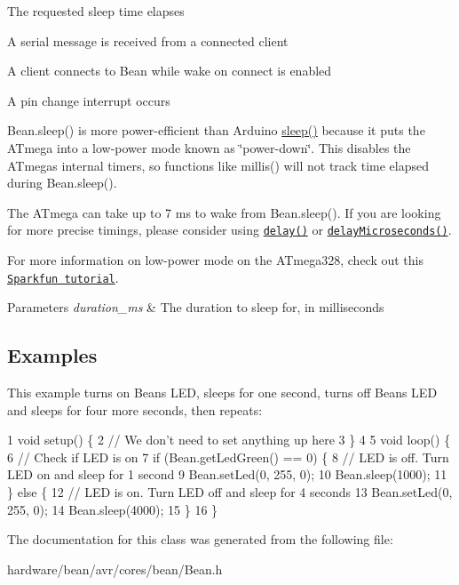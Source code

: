 \begin{DoxyItemize}
\item The requested sleep time elapses
\item A serial message is received from a connected client
\item A client connects to Bean while wake on connect is enabled
\item A pin change interrupt occurs
\end{DoxyItemize}

{\ttfamily Bean.\+sleep()} is more power-\/efficient than Arduino {\ttfamily \hyperlink{class_bean_class_a15d6716d0bdc66a0345acc29d0c14a14}{sleep()}} because it puts the A\+Tmega into a low-\/power mode known as \char`\"{}power-\/down\char`\"{}. This disables the A\+Tmega\textquotesingle{}s internal timers, so functions like {\ttfamily millis()} will not track time elapsed during {\ttfamily Bean.\+sleep()}.

The A\+Tmega can take up to 7 ms to wake from {\ttfamily Bean.\+sleep()}. If you are looking for more precise timings, please consider using \href{https://www.arduino.cc/en/Reference/Delay}{\tt delay()} or \href{https://www.arduino.cc/en/Reference/DelayMicroseconds}{\tt delay\+Microseconds()}.

For more information on low-\/power mode on the A\+Tmega328, check out this \href{https://www.sparkfun.com/tutorials/309}{\tt Sparkfun tutorial}.


\begin{DoxyParams}{Parameters}
{\em duration\+\_\+ms} & The duration to sleep for, in milliseconds\\
\hline
\end{DoxyParams}
\subsection*{Examples}

This example turns on Bean\textquotesingle{}s L\+ED, sleeps for one second, turns off Bean\textquotesingle{}s L\+ED and sleeps for four more seconds, then repeats\+:


\begin{DoxyCodeInclude}
1 void setup() \{
2   // We don't need to set anything up here
3 \}
4 
5 void loop() \{
6   // Check if LED is on
7   if (Bean.getLedGreen() == 0) \{
8     // LED is off. Turn LED on and sleep for 1 second
9     Bean.setLed(0, 255, 0);
10     Bean.sleep(1000);
11   \} else \{
12     // LED is on. Turn LED off and sleep for 4 seconds
13     Bean.setLed(0, 255, 0);
14     Bean.sleep(4000);
15   \}
16 \}
\end{DoxyCodeInclude}
 

The documentation for this class was generated from the following file\+:\begin{DoxyCompactItemize}
\item 
hardware/bean/avr/cores/bean/Bean.\+h\end{DoxyCompactItemize}
